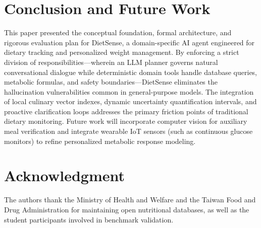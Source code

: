 \documentclass[conference]{IEEEtran}
\begin{document}
\section{Conclusion and Future Work}
This paper presented the conceptual foundation, formal architecture, and rigorous evaluation plan for DietSense, a domain-specific AI agent engineered for dietary tracking and personalized weight management. By enforcing a strict division of responsibilities---wherein an LLM planner governs natural conversational dialogue while deterministic domain tools handle database queries, metabolic formulas, and safety boundaries---DietSense eliminates the hallucination vulnerabilities common in general-purpose models. The integration of local culinary vector indexes, dynamic uncertainty quantification intervals, and proactive clarification loops addresses the primary friction points of traditional dietary monitoring. Future work will incorporate computer vision for auxiliary meal verification and integrate wearable IoT sensors (such as continuous glucose monitors) to refine personalized metabolic response modeling.

\section*{Acknowledgment}
The authors thank the Ministry of Health and Welfare and the Taiwan Food and Drug Administration for maintaining open nutritional databases, as well as the student participants involved in benchmark validation.



\end{document}
